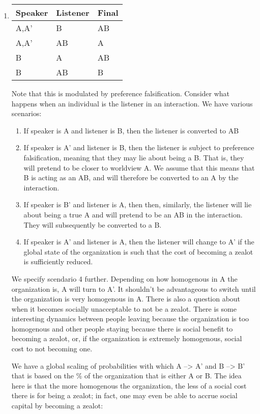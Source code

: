\documentclass[]{article}
\providecommand{\tightlist}{%
  \setlength{\itemsep}{0pt}\setlength{\parskip}{0pt}}
\begin{document}
\begin{enumerate}
\def\labelenumi{\arabic{enumi}.}
\item
  \begin{longtable}[]{@{}lll@{}}
  \toprule
  Speaker & Listener & Final\tabularnewline
  \midrule
  \endhead
  A,A' & B & AB\tabularnewline
  A,A' & AB & A\tabularnewline
  B & A & AB\tabularnewline
  B & AB & B\tabularnewline
  \bottomrule
  \end{longtable}

  Note that this is modulated by preference falsification. Consider what
  happens when an individual is the listener in an interaction. We have
  various scenarios:

  \begin{enumerate}
  \def\labelenumii{\arabic{enumii}.}
  \tightlist
  \item
    If speaker is A and listener is B, then the listener is converted to
    AB
  \item
    If speaker is A' and listener is B, then the listener is subject to
    preference falsification, meaning that they may lie about being a B.
    That is, they will pretend to be closer to worldview A. We assume
    that this means that B is acting as an AB, and will therefore be
    converted to an A by the interaction.
  \item
    If speaker is B' and listener is A, then then, similarly, the
    listener will lie about being a true A and will pretend to be an AB
    in the interaction. They will subsequently be converted to a B.
  \item
    If speaker is A' and listener is A, then the listener will change to
    A' if the global state of the organization is such that the cost of
    becoming a zealot is sufficiently reduced.
  \end{enumerate}

  We specify scendario 4 further. Depending on how homogenous in A the
  organization is, A will turn to A'. It shouldn't be advantageous to
  switch until the organization is very homogenous in A. There is also a
  question about when it becomes socially unacceptable to not be a
  zealot. There is some interesting dynamics between people leaving
  because the organization is too homogenous and other people staying
  because there is social benefit to becoming a zealot, or, if the
  organization is extremely homogenous, social cost to not becoming one.

  We have a global scaling of probabilities with which A
  --\textgreater{} A' and B --\textgreater{} B' that is based on the \%
  of the organization that is either A or B. The idea here is that the
  more homogenous the organization, the less of a social cost there is
  for being a zealot; in fact, one may even be able to accrue social
  capital by becoming a zealot:


\end{enumerate}
\end{document}
